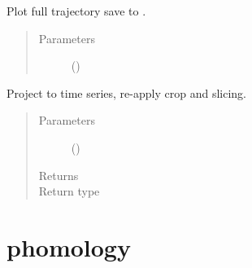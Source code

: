 \documentclass[letterpaper,10pt,openany,oneside,english]{sphinxmanual}
\begin{document}
\begin{fulllineitems}

\begin{fulllineitems}
\label{\detokenize{signals:signals.Trajectory.plot_full}}
Plot full trajectory save to .
\begin{quote}\begin{description}
\item[{Parameters}] \leavevmode
{} () \textendash{} 

\end{description}\end{quote}

\end{fulllineitems}


\begin{fulllineitems}
\label{\detokenize{signals:signals.Trajectory.project}}
Project  to time series, re-apply crop and slicing.
\begin{quote}\begin{description}
\item[{Parameters}] \leavevmode
{} () \textendash{} 

\item[{Returns}] \leavevmode


\item[{Return type}] \leavevmode
{\hyperref[\detokenize{signals:signals.TimeSeries}]{}}

\end{description}\end{quote}

\end{fulllineitems}


\end{fulllineitems}



\section{phomology}
\label{\detokenize{phomology:phomology}}\label{\detokenize{phomology:module-phomology}}\label{\detokenize{phomology::doc}}
\end{document}
